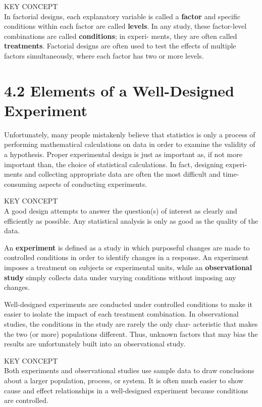 \documentclass[
]{report}
\theoremstyle{definition}
\theoremstyle{definition}
\theoremstyle{definition}
\theoremstyle{definition}
\theoremstyle{remark}
\begin{document}
KEY CONCEPT\\
In factorial designs, each explanatory variable is called a \textbf{factor} and specific conditions within each
factor are called \textbf{levels}. In any study, these factor-level combinations are called \textbf{conditions}; in experi-
ments, they are often called \textbf{treatments}. Factorial designs are often used to test the effects of multiple
factors simultaneously, where each factor has two or more levels.

\hypertarget{elements-of-a-well-designed-experiment}{%
\chapter{4.2 Elements of a Well-Designed Experiment}\label{elements-of-a-well-designed-experiment}}

Unfortunately, many people mistakenly believe that statistics is only a process of performing mathematical
calculations on data in order to examine the validity of a hypothesis. Proper experimental design is just as
important as, if not more important than, the choice of statistical calculations. In fact, designing experi-
ments and collecting appropriate data are often the most difficult and time-consuming aspects of conducting
experiments.

KEY CONCEPT\\
A good design attempts to answer the question(s) of interest as clearly and efficiently as possible. Any
statistical analysis is only as good as the quality of the data.

An \textbf{experiment} is defined as a study in which purposeful changes are made to controlled conditions in
order to identify changes in a response. An experiment imposes a treatment on subjects or experimental units,
while an \textbf{observational study} simply collects data under varying conditions without imposing any changes.

Well-designed experiments are conducted under controlled conditions to make it easier to isolate the impact
of each treatment combination. In observational studies, the conditions in the study are rarely the only char-
acteristic that makes the two (or more) populations different. Thus, unknown factors that may bias the results
are unfortunately built into an observational study.

KEY CONCEPT\\
Both experiments and observational studies use sample data to draw conclusions about a larger
population, process, or system. It is often much easier to show cause and effect relationships in a
well-designed experiment because conditions are controlled.
\end{document}
